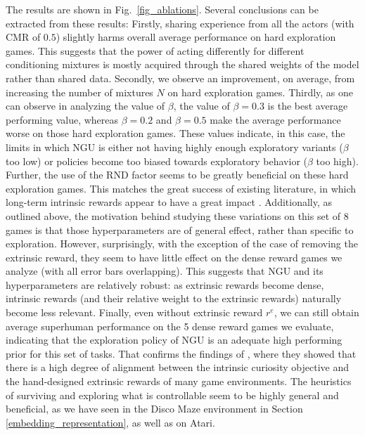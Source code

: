 \documentclass{article} %
\begin{document}
The results are shown in Fig.~\ref{fig_ablations}. Several conclusions can be extracted from these results: 
Firstly, sharing experience from all the actors (with CMR of $0.5$) slightly harms overall average performance on hard exploration games. This suggests that the power of acting differently for different conditioning mixtures is mostly acquired through the shared weights of the model rather than shared data.
%
Secondly, we observe an improvement, on average, from increasing the number of mixtures $N$ on hard exploration games.
Thirdly, as one can observe in analyzing the value of $\beta$, the value of $\beta = 0.3$ is the best average performing value, whereas $\beta = 0.2$ and $\beta = 0.5$ make the average performance worse on those hard exploration games. These values indicate, in this case, the limits in which NGU is either not having highly enough exploratory variants ($\beta$ too low) or policies become too biased towards exploratory behavior ($\beta$ too high).
%
Further, the use of the RND factor seems to be greatly beneficial on these hard exploration games. This matches the great success of existing literature, in which long-term intrinsic rewards appear to have a great impact \citep{bellemare2016unifying, ostrovski2017count, choi2018contingency}.
%
Additionally, as outlined above, the motivation behind studying these variations on this set of $8$ games is that those hyperparameters are of general effect, rather than specific to exploration. However, surprisingly, with the exception of the case of removing the extrinsic reward, they seem to have little effect on the dense reward games we analyze (with all error bars overlapping). This suggests that NGU and its hyperparameters are relatively robust: as extrinsic rewards become dense, intrinsic rewards (and their relative weight to the extrinsic rewards) naturally become less relevant.
Finally, even without extrinsic reward $r^e$, we can still obtain average superhuman performance on the 5 dense reward games we evaluate, indicating that the exploration policy of NGU is an adequate high performing prior for this set of tasks.
%
That confirms the findings of \citet{burda2018large}, where they showed that there is a high degree of alignment between the intrinsic curiosity objective and the hand-designed extrinsic rewards of many game environments.
%
The heuristics of surviving and exploring what is controllable seem to be highly general and beneficial, as we have seen in the Disco Maze environment in Section \ref{embedding_representation}, as well as on Atari.
\end{document}
